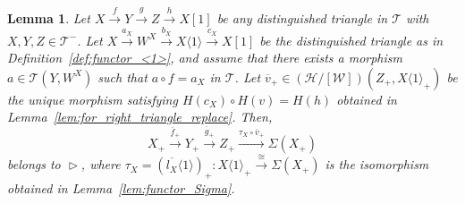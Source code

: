 \documentclass[a4paper,reqno,10pt]{amsart}
\DeclareRobustCommand{\darkblueedit}[1]{#1}
\newtheorem{lemma}[lemma]{Lemma}
\theoremstyle{definition}
\theoremstyle{definition}
\theoremstyle{definition}
\theoremstyle{definition}
\theoremstyle{plain}
\newcommand{\CH}{\mathcal{H}}
\newcommand{\CT}{\mathcal{T}}
\newcommand{\CW}{\mathcal{W}}
\begin{document}
\begin{lemma}\label{lem:right_triangle_replace}
Let $X\xrightarrow{f}Y\xrightarrow{g}Z\xrightarrow{h}X[1]$ be any distinguished triangle in $\CT$ with $X,Y,Z\in\CT^-$.
Let
$X\xrightarrow{a_X}W^X\xrightarrow{b_X}X\langle 1\rangle\xrightarrow{c_X}X[1]$
be the distinguished triangle as in Definition~\ref{def:functor_<1>}, and assume that there exists \darkblueedit{a morphism} $a\in\CT(Y,W^X)$ such that $a\circ f=a_X$ in $\CT$.
Let $\overline{v}_+\in(\CH/[\CW])(Z_+,X\langle1\rangle_+)$ be the unique morphism satisfying $H(c_X)\circ H(v)=H(h)$ obtained in Lemma~\ref{lem:for_right_triangle_replace}.
Then, 
\[ X_+\xrightarrow{\overline{f}_+}Y_+\xrightarrow{\overline{g}_+}Z_+\xrightarrow{\tau_X\circ \overline{v}_+}\Sigma (X_+)
\]
belongs to $\vartriangleright$, where $\tau_X=(\overline{l_X}\langle1\rangle)_+\colon X\langle1\rangle_+\xrightarrow{\cong}\Sigma(X_+)$ is the isomorphism obtained in Lemma~\ref{lem:functor_Sigma}.
\end{lemma}
\end{document}
